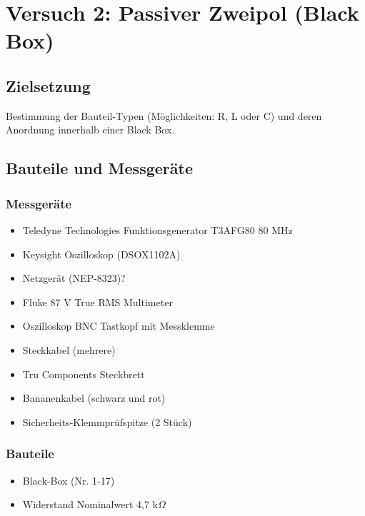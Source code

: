 \documentclass[a4paper,12pt]{article}
\begin{document}
\newpage
\section{Versuch 2: Passiver Zweipol (Black Box)}
\subsection{Zielsetzung}
Bestimmung der Bauteil-Typen (Möglichkeiten: R, L oder C) und deren Anordnung innerhalb einer
Black Box.

\subsection{Bauteile und Messgeräte}
\subsubsection*{Messgeräte}
\begin{itemize}
\item Teledyne Technologies Funktionsgenerator T3AFG80 80 MHz
\item Keysight Oszilloskop (DSOX1102A)
\item Netzgerät (NEP-8323)?
\item Fluke 87 V True RMS Multimeter
\item Oszilloskop BNC Tastkopf mit Messklemme
\item Steckkabel (mehrere)
\item Tru Components Steckbrett
\item Bananenkabel (schwarz und rot)
\item Sicherheits-Klemmprüfspitze (2 Stück)
\end{itemize}

\subsubsection*{Bauteile}
\begin{itemize}
\item Black-Box (Nr. 1-17)
\item Widerstand Nominalwert 4,7 k$\Omega$
\end{itemize}
\newpage
\end{document}
